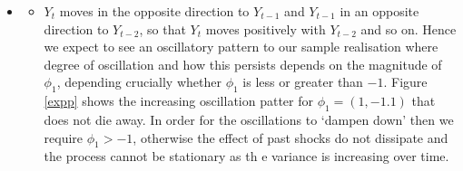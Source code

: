\documentclass[openany]{tufte-book} %
\begin{document}
        	\begin{itemize}        		\item[] 
        		\begin{itemize} \item[]  $Y_t$ moves in the opposite direction to $Y_{t-1}$ and $Y_{t-1}$ in an opposite direction to $Y_{t-2}$, so that $Y_t$ moves positively with $Y_{t-2}$ and so on. Hence we expect to see an oscillatory pattern to our sample realisation where  degree of oscillation and how this persists depends on the magnitude of $\phi_1$, depending crucially whether $\phi_1$ is less or greater than $-1$.  Figure \ref{expp} shows the increasing oscillation patter for $\phi_1=(1,-1.1)$ that does not die away.  In order for the oscillations to `dampen down' then we require $\phi_1>-1$, otherwise the effect of past shocks do not dissipate and the process  cannot be stationary as th e variance is increasing over time. \end{itemize}\vspace{15pt}
\end{itemize}

 
\end{document}
